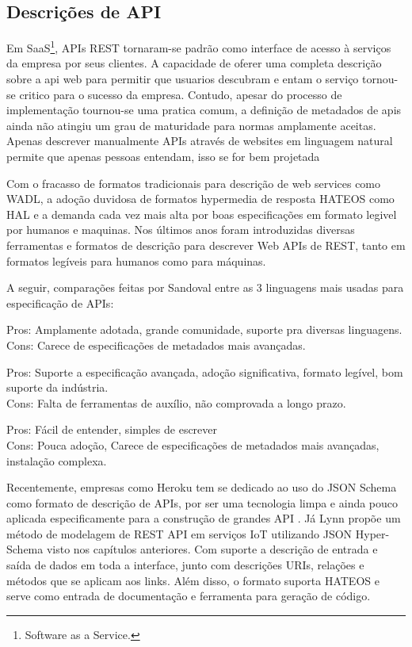 \subsection[Descrições de API]{Descrições de API}

Em SaaS\footnote{
  Software as a Service.
}, APIs REST tornaram-se padrão como interface de acesso à serviços da empresa por seus clientes. A capacidade de oferer uma completa descrição sobre a api web para permitir que usuarios descubram e entam o serviço tornou-se critico para o sucesso da empresa. Contudo, apesar do processo de implementação tournou-se uma pratica comum, a definição de metadados de apis ainda não atingiu um grau de maturidade para normas amplamente aceitas. Apenas descrever manualmente APIs através de websites em linguagem natural permite que apenas pessoas entendam, isso se for bem projetada \cite{LuckyEtAl2016}

Com o fracasso de formatos tradicionais para descrição de web services como WADL, a adoção duvidosa de formatos hypermedia de resposta HATEOS como HAL e a demanda cada vez mais alta por boas especificações em formato legivel por humanos e maquinas. Nos últimos anos foram introduzidas diversas ferramentas e formatos de descrição para descrever Web APIs de REST, tanto em formatos legíveis para humanos como para máquinas. \cite{LuckyEtAl2016}

A seguir, comparações feitas por Sandoval entre as 3 linguagens mais usadas para especificação de APIs: \cite{Sandoval2015}

\begin{description}[leftmargin=8em,style=nextline]
  \item[\textbf{OpenAPI} (Swagger)] Pros: Amplamente adotada, grande comunidade, suporte pra diversas linguagens. \\ Cons: Carece de especificações de metadados mais avançadas.
  \item[\textbf{RAML}] Pros: Suporte a especificação avançada, adoção significativa, formato legível, bom suporte da indústria. \\ Cons: Falta de ferramentas de auxílio, não comprovada a longo prazo.
  \item[\textbf{API Blueprint}] Pros: Fácil de entender, simples de escrever \\ Cons: Pouca adoção, Carece de especificações de metadados mais avançadas, instalação complexa.
\end{description}

Recentemente, empresas como Heroku tem se dedicado ao uso do JSON Schema como formato de descrição de APIs, por ser uma tecnologia limpa e ainda pouco aplicada especificamente para a construção de grandes API \cite{Leach2014}. Já Lynn propõe um método de modelagem de REST API em serviços IoT utilizando JSON Hyper-Schema visto nos capítulos anteriores. Com suporte a descrição de entrada e saída de dados em toda a interface, junto com descrições URIs, relações e métodos que se aplicam aos links. Além disso, o formato suporta HATEOS e serve como entrada de documentação e ferramenta para geração de código. \cite{LynnEtAl2016}
